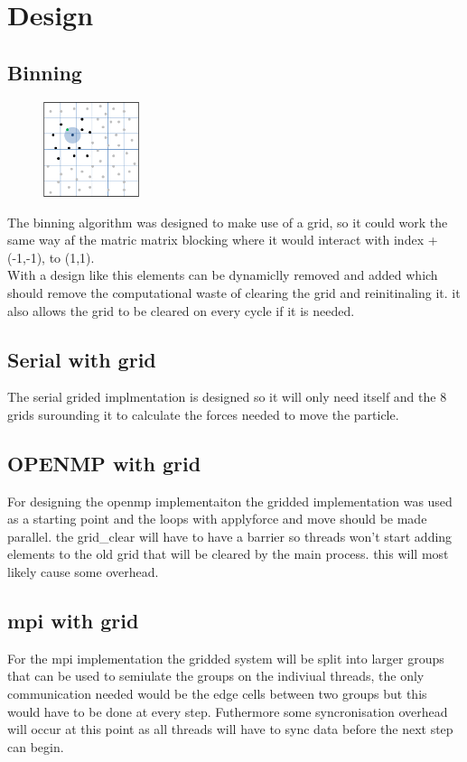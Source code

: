 \documentclass[a4paper,10pt,titlepage]{report}
\begin{document}
\section{Design}

\subsection{Binning}
\begin{figure} %
    \centering
    \includegraphics[width=0.25\textwidth]{grid.png}
\end{figure}
The binning algorithm was designed to make use of a grid, so it could work the same way af the matric matrix blocking where it would interact with index +(-1,-1), to (1,1). \\

With a design like this elements can be dynamiclly removed and added which should remove the computational waste of clearing the grid and reinitinaling it. it also allows the grid to be cleared on every cycle if it is needed. \\

\subsection{Serial with grid}
The serial grided implmentation is designed so it will only need itself and the 8 grids surounding it to calculate the forces needed to move the particle.

\subsection{OPENMP with grid}
For designing the openmp implementaiton the gridded implementation was used as a starting point and the loops with applyforce and move should be made parallel. the grid\_clear will have to have a barrier so threads won't start adding elements to the old grid that will be cleared by the main process. this will most likely cause some overhead.

\subsection{mpi with grid}
For the mpi implementation the gridded system will be split into larger groups that can be used to semiulate the groups on the indiviual threads, the only communication needed would be the edge cells between two groups but this would have to be done at every step. Futhermore some syncronisation overhead will occur at this point as all threads will have to sync data before the next step can begin.
\end{document}
